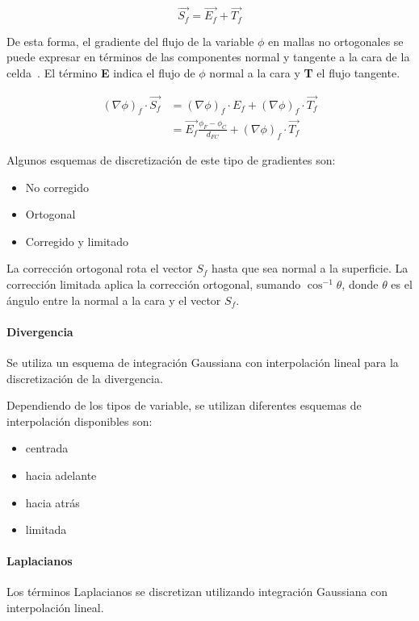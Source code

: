 \begin{equation}
  \vec{S_{f}}= \vec{E_{f}} + \vec{T_{f}}
\end{equation}

De esta forma, el gradiente del flujo de la variable $\phi$ en mallas no
ortogonales se puede expresar en términos de las componentes normal y tangente a
la cara de la celda~\parencite{moukalled}.
%
El término \textbf{E} indica el flujo de $\phi$ normal a la cara y \textbf{T} el
flujo tangente.

\begin{align}
  \label{eq:gradiente}
  {(\nabla \phi)}_{f}\cdot \vec{S_{f}} &= {(\nabla \phi)}_{f}\cdot E_{f} + {(\nabla \phi)}_{f}\cdot \vec{T_{f}} \\
  &= \vec{E_{f}}\frac{\phi_{F}-\phi_{C}}{d_{FC}}+ {(\nabla \phi)}_{f}\cdot \vec{T_{f}}
\end{align}

%
Algunos esquemas de discretización de este tipo de gradientes son:
\begin{itemize}
  \item No corregido
  \item Ortogonal
  \item Corregido y limitado
\end{itemize}

La corrección ortogonal rota el vector $S_{f}$ hasta que sea normal a la superficie.
%
La corrección limitada aplica la corrección ortogonal, sumando
$\cos^{-1}{\theta}$, donde $\theta$ es el ángulo entre la normal a la cara y el
vector $S_{f}$.

\paragraph{Divergencia}
%
Se utiliza un esquema de integración Gaussiana con interpolación lineal para
la discretización de la divergencia.

Dependiendo de los tipos de variable, se utilizan diferentes esquemas de
interpolación disponibles son:
%
\begin{itemize}
        \item centrada
        \item hacia adelante
        \item hacia atrás
        \item limitada
\end{itemize}

\paragraph{Laplacianos}
%
Los términos Laplacianos se discretizan utilizando integración Gaussiana con
interpolación lineal.


